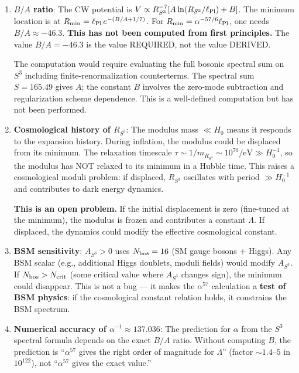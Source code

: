 \documentclass[11pt]{article}
\newcommand{\alphafine}{\alpha}
\newcommand{\lPl}{\ell_{\rm Pl}}
\begin{document}
\begin{enumerate}[label=(\alph*)]
\item \textbf{$B/A$ ratio}: The CW potential is
  $V \propto R_{S^3}^{-7}[A\ln(R_{S^3}/\lPl) + B]$. The minimum
  location is at $R_{\rm min} = \lPl\,e^{-(B/A + 1/7)}$. For
  $R_{\rm min} = \alphafine^{-57/6}\lPl$, one needs $B/A \approx -46.3$.
  \textbf{This has not been computed from first principles.} The value
  $B/A = -46.3$ is the value REQUIRED, not the value DERIVED.

  The computation would require evaluating the full bosonic spectral
  sum on $S^3$ including finite-renormalization counterterms. The
  spectral sum $S = 165.49$ gives $A$; the constant $B$ involves
  the zero-mode subtraction and regularization scheme dependence.
  This is a well-defined computation but has not been performed.

\item \textbf{Cosmological history of $R_{S^3}$}: The modulus mass
  $\ll H_0$ means it responds to the expansion history. During
  inflation, the modulus could be displaced from its minimum.
  The relaxation timescale $\tau \sim 1/m_{R_{S^3}} \sim
  10^{70}/\text{eV} \gg H_0^{-1}$, so the modulus has NOT relaxed
  to its minimum in a Hubble time. This raises a cosmological
  moduli problem: if displaced, $R_{S^3}$ oscillates with period
  $\gg H_0^{-1}$ and contributes to dark energy dynamics.

  \textbf{This is an open problem.} If the initial displacement is
  zero (fine-tuned at the minimum), the modulus is frozen and
  contributes a constant $\Lambda$. If displaced, the dynamics
  could modify the effective cosmological constant.

\item \textbf{BSM sensitivity}: $A_{S^3} > 0$ uses $N_{\rm bos} = 16$
  (SM gauge bosons + Higgs). Any BSM scalar (e.g., additional Higgs
  doublets, moduli fields) would modify $A_{S^3}$. If $N_{\rm bos} >
  N_{\rm crit}$ (some critical value where $A_{S^3}$ changes sign),
  the minimum could disappear. This is not a bug --- it makes the
  $\alpha^{57}$ calculation a \textbf{test of BSM physics}: if the
  cosmological constant relation holds, it constrains the BSM
  spectrum.

\item \textbf{Numerical accuracy of $\alpha^{-1} \approx 137.036$}:
  The prediction for $\alpha$ from the $S^3$ spectral formula depends
  on the exact $B/A$ ratio. Without computing $B$, the prediction
  is ``$\alpha^{57}$ gives the right order of magnitude for $\Lambda$''
  (factor $\sim 1.4$--$5$ in $10^{122}$), not ``$\alpha^{57}$ gives
  the exact value.''
\end{enumerate}
\end{document}
